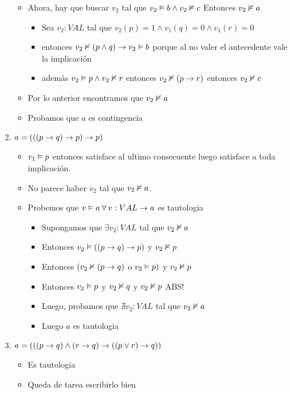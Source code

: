 \documentclass[14pt,a4paper,fleqn]{article}
\begin{document}
\begin{enumerate}
\begin{itemize}
		\vspace{5pt}
		\item Ahora, hay que buscar $v_{2}$ tal que $v_{2} \vDash b \wedge v_{2} \nvDash c$ Entonces $v_{2} \nvDash a$
		\begin{itemize}
			\item Sea $v_{2}:VAL$ tal que  $v_{2}(p) = 1 \wedge v_{1}(q) = 0 \wedge v_{1}(r) = 0$
			\item entonces $v_{2} \nvDash (p \wedge q) \rightarrow v_{2} \vDash b$ porque al no valer el antecedente vale la implicación
			\item además $v_{2} \vDash p \wedge v_{2} \nvDash r$ entonces $v_{2} \nvDash (p \rightarrow r) $ entonces $v_{2} \nvDash c$
		\end{itemize}
		\item Por lo anterior encontramos que $v_{2} \nvDash a$
		\vspace{5pt}		
		\item Probamos que $a$ es contingencia
	\end{itemize}
	\item $a=(((p \rightarrow q) \rightarrow p) \rightarrow p)$
	\begin{itemize}
		\item $v_{1} \vDash p $ entonces satisface al ultimo consecuente luego satisface a toda implicación.
		\item No parece haber $v_{2}$ tal que $v_{2} \nvDash a$. 
		\item Probemos que $v \vDash a \: \forall \: v: VAL \rightarrow a $ es tautologia
		\vspace{5pt}
		\begin{itemize}
			\item Supongamos que $\exists v_{2}:VAL$ tal que $v_{2} \nvDash a$
			\item Entonces $v_{2} \vDash ((p \rightarrow q) \rightarrow p)$ y $v_{2} \nvDash p$
			\item Entonces $(v_{2} \nvDash (p \rightarrow q) $ o $v_{2} \vDash p )$ y $v_{2} \nvDash p$
			\item Entonces $v_{2} \vDash p $ y $v_{2} \nvDash q$ y $v_{2} \nvDash p$ ABS!
			\item Luego, probamos que $\nexists v_{2} :VAL $ tal que $v_{2} \nvDash a$
			\item Luego $a$ es tautologia
		\end{itemize}
	\end{itemize}
	\item $a=(((p \rightarrow q) \wedge (r \rightarrow q) \rightarrow ((p \vee r) \rightarrow q)) $
	\begin{itemize}
		\item Es tautologia
		\item Queda de tarea escribirlo bien
	\end{itemize}
\end{enumerate}
\newpage
\end{document}
